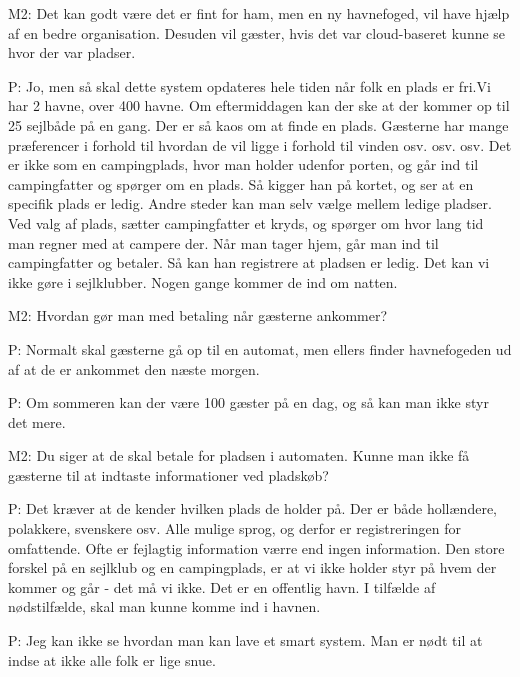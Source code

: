 \documentclass{article}
\begin{document}
M2: Det kan godt være det er fint for ham, men en ny havnefoged, vil have hjælp af en bedre organisation. Desuden vil gæster, hvis det var cloud-baseret kunne se hvor der var pladser.

P: Jo, men så skal dette system opdateres hele tiden når folk en plads er fri.Vi har 2 havne, over 400 havne. Om eftermiddagen kan der ske at der kommer op til 25 sejlbåde på en gang. Der er så kaos om at finde en plads. Gæsterne har mange præferencer i forhold til hvordan de vil ligge i forhold til vinden osv. osv. osv. Det er ikke som en campingplads, hvor man holder udenfor porten, og går ind til campingfatter og spørger om en plads. Så kigger han på kortet, og ser at en specifik plads er ledig. Andre steder kan man selv vælge mellem ledige pladser. Ved valg af plads, sætter campingfatter et kryds, og spørger om hvor lang tid man regner med at campere der. Når man tager hjem, går man ind til campingfatter og betaler. Så kan han registrere at pladsen er ledig. Det kan vi ikke gøre i sejlklubber. Nogen gange kommer de ind om natten.

M2: Hvordan gør man med betaling når gæsterne ankommer?

P: Normalt skal gæsterne gå op til en automat, men ellers finder havnefogeden ud af at de er ankommet den næste morgen.

P: Om sommeren kan der være 100 gæster på en dag, og så kan man ikke styr det mere.

M2: Du siger at de skal betale for pladsen i automaten. Kunne man ikke få gæsterne til at indtaste informationer ved pladskøb? 

P: Det kræver at de kender hvilken plads de holder på. Der er både hollændere, polakkere, svenskere osv. Alle mulige sprog, og derfor er registreringen for omfattende. Ofte er fejlagtig information værre end ingen information. Den store forskel på en sejlklub og en campingplads, er at vi ikke holder styr på hvem der kommer og går - det må vi ikke. Det er en offentlig havn. I tilfælde af nødstilfælde, skal man kunne komme ind i havnen.

P: Jeg kan ikke se hvordan man kan lave et smart system. Man er nødt til at indse at ikke alle folk er lige snue. 
\end{document}
